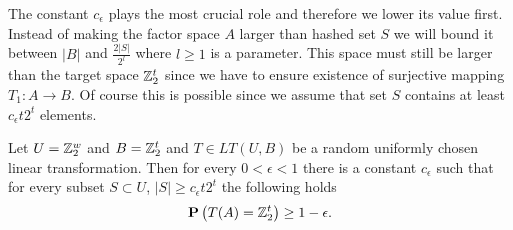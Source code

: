 The constant $c_\epsilon$ plays the most crucial role and therefore we lower its value first. Instead of making the factor space $A$ larger than hashed set $S$ we will bound it between $|B|$ and $\frac{2|S|}{2 ^ l}$ where $l \geq 1$ is a parameter. This space must still be larger than the target space $\mathbb{Z}_{2}^{t}$ since we have to ensure existence of surjective mapping $T_1: A \rightarrow B$. Of course this is possible since we assume that set $S$ contains at least $c_\epsilon t 2^t$ elements.

\begin{remark}
Let $U = \mathbb{Z}_{2}^{w}$ and $B = \mathbb{Z}_{2}^{t}$ and $T \in LT(U, B)$ be a random uniformly chosen linear transformation. Then for every $0 < \epsilon < 1$ there is a constant $c_\epsilon$ such that for every subset $S \subset U$, $|S| \geq c_\epsilon t 2^t$ the following holds
\[
\mathbf{P}\left(T(A) = \mathbb{Z}_{2}^{t}\right) \geq 1 - \epsilon \text{.}
\]
\end{remark}
